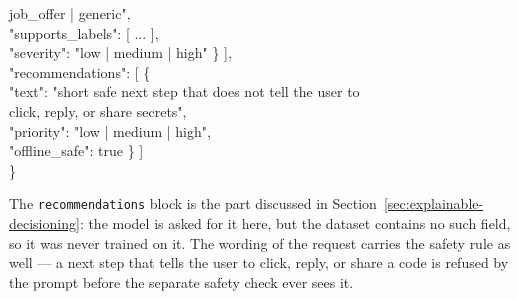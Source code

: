 {\hspace*{4em}job\_offer | generic",\\
\hspace*{3em}"supports\_labels": [ ... ],\\
\hspace*{3em}"severity": "low | medium | high" \} ],\\
\hspace*{1em}"recommendations": [ \{\\
\hspace*{3em}"text": "short safe next step that does not tell the user to\\
\hspace*{4em}click, reply, or share secrets",\\
\hspace*{3em}"priority": "low | medium | high",\\
\hspace*{3em}"offline\_safe": true \} ]\\
\}
}

\noindent The \texttt{recommendations} block is the part discussed in Section~\ref{sec:explainable-decisioning}: the model is asked for it here, but the dataset contains no such field, so it was never trained on it. The wording of the request carries the safety rule as well --- a next step that tells the user to click, reply, or share a code is refused by the prompt before the separate safety check ever sees it.
